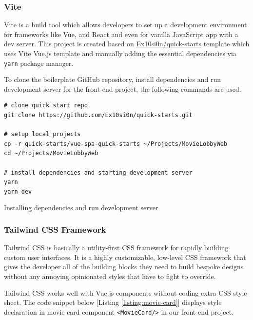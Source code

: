\documentclass{article}
\begin{document}
\subsubsection{Vite}

Vite is a build tool which allows developers to set up a development environment for frameworks like Vue, and React and even for vanilla JavaScript app with a dev server. \cite{vite} This project is created based on \href{https://github.com/Ex10si0n/quick-starts}{Ex10si0n/quick-starts} template which uses Vite Vue.js template and manually adding the essential dependencies via \verb|yarn| package manager.

To clone the boilerplate GitHub repository, install dependencies and run development server for the front-end project, the following commands are used.

\begin{listing}[!htp]
\begin{verbatim}
# clone quick start repo
git clone https://github.com/Ex10si0n/quick-starts.git

# setup local projects
cp -r quick-starts/vue-spa-quick-starts ~/Projects/MovieLobbyWeb
cd ~/Projects/MovieLobbyWeb

# install dependencies and starting development server
yarn
yarn dev
\end{verbatim}
\caption{Installing dependencies and run development server}
\label{listing:yarn}
\end{listing}


\subsubsection{Tailwind CSS Framework}

Tailwind CSS is basically a utility-first CSS framework for rapidly building custom user interfaces. It is a highly customizable, low-level CSS framework that gives the developer all of the building blocks they need to build bespoke designs without any annoying opinionated styles that have to fight to override. \cite{tw}

Tailwind CSS works well with Vue.js components without coding extra CSS style sheet. The code snippet below [Listing \ref{listing:movie-card}] displays style declaration in movie card component \verb|<MovieCard/>| in our front-end project.
\end{document}
